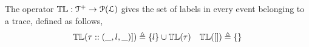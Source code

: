 %
  The operator $\mathbb{TL} : \mathcal{T}^{+}\to \mathcal{P}{(\mathcal{L})}$ gives the set of labels in every event belonging to 
  a trace,
defined as follows,
\[
\mathbb{TL}{(\mathtt{\tau}  :: (\_, l, \_)])} \triangleq \{l\} \cup \mathbb{TL}{(\mathtt{\tau} )}
~~~
\mathbb{TL}({[ ]}) \triangleq \{\}
\]
%
%
%
%
%

